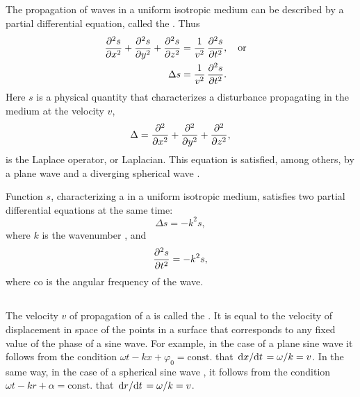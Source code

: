\subsection{}\label{30.2.9} The propagation of waves in a uniform isotropic medium can be described by a partial differential equation, called the . Thus
\begin{align*}%
\pdv[2]{s}{x} + \pdv[2]{s}{y} + \pdv[2]{s}{z} & = \frac{1}{v^{2}} \, \pdv[2]{s}{t}, \qor \\   
\Delta s & = \frac{1}{v^{2}} \, \pdv[2]{s}{t}.
\end{align*}
Here $s$ is a physical quantity that characterizes a disturbance propagating in the medium at the velocity $v$, 
\begin{equation*}%
\Delta = \pdv[2]{x} + \pdv[2]{y} + \pdv[2]{z},
\end{equation*}
is the Laplace operator, or Laplacian. This equation is satisfied, among others, by a plane wave  and a diverging spherical wave .

Function $s$, characterizing a  in a uniform isotropic medium, satisfies two partial differential equations at the same time:
\begin{equation*}%
\Delta s = -k^{2}s,
\end{equation*}
where $k$ is the wavenumber , and
\begin{equation*}%
\pdv[2]{s}{t} = -k^{2}s,
\end{equation*}
where co is the angular frequency of the wave.

\subsection{}\label{30.2.10} The velocity $v$ of propagation of a  is called the . It is equal to the velocity of displacement in space of the points in a surface that corresponds to any fixed value of the phase of a sine wave. For example, in the case of a plane sine wave  it follows from the condition $\omega t - kx + \varphi_{0} = \text{const.}$ that $\dv*{x}{t} = \omega/k = v$. In the same way, in the case of a spherical sine wave , it follows from the condition $\omega t - kr + \alpha = \text{const.}$ that $\dv*{r}{t} = \omega / k = v$.

